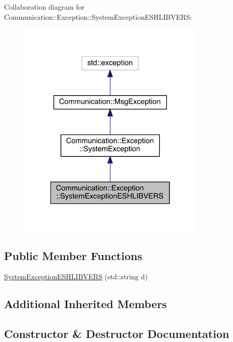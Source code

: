 Collaboration diagram for Communication\+:\+:Exception\+:\+:System\+Exception\+E\+S\+H\+L\+I\+B\+V\+E\+R\+S\+:\nopagebreak
\begin{figure}[H]
\begin{center}
\leavevmode
\includegraphics[width=256pt]{class_communication_1_1_exception_1_1_system_exception_e_s_h_l_i_b_v_e_r_s__coll__graph}
\end{center}
\end{figure}
\subsection*{Public Member Functions}
\begin{DoxyCompactItemize}
\item 
\hyperlink{class_communication_1_1_exception_1_1_system_exception_e_s_h_l_i_b_v_e_r_s_a1c5e18885c3cdabdc9e108cd26decf1f}{System\+Exception\+E\+S\+H\+L\+I\+B\+V\+E\+R\+S} (std\+::string d)
\end{DoxyCompactItemize}
\subsection*{Additional Inherited Members}


\subsection{Constructor \& Destructor Documentation}
\hypertarget{class_communication_1_1_exception_1_1_system_exception_e_s_h_l_i_b_v_e_r_s_a1c5e18885c3cdabdc9e108cd26decf1f}{}
